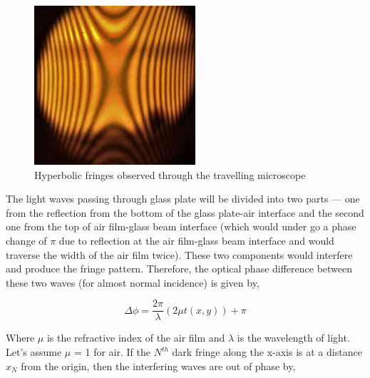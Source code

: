 \begin{figure}[H]
    \centering
    \label{fig:2}
    \includegraphics[width=1\columnwidth]{images/f3.jpg}
    \caption{Hyperbolic fringes observed through the travelling microscope}
\end{figure}

The light waves passing through glass plate will be divided into two parts --- one from the reflection from the bottom of the glass plate-air interface and the second one from the top of air film-glass
beam interface (which would under go a phase change of $\pi$ due to reflection at the air film-glass beam interface and would traverse the width of the air film twice). These two components would interfere and produce the fringe pattern.
Therefore, the optical phase difference between these two waves (for almost normal incidence) is
given by,

\begin{equation}
    \Delta \phi = \frac{2\pi}{\lambda}(2\mu t(x, y)) + \pi
\end{equation}

Where $\mu$ is the refractive index of the air film and $\lambda$ is the wavelength of light. Let's assume $\mu$ = 1 for air. If the $N^{th}$ dark fringe along the x-axis is at a distance $x_N$ from the origin, then the interfering waves are out of phase by,

